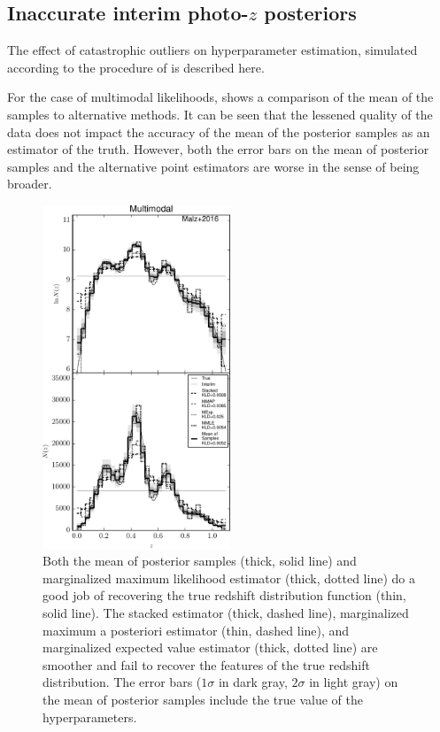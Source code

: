 \subsection{Inaccurate interim photo-$z$ posteriors}

The effect of catastrophic outliers on hyperparameter estimation, simulated according to the procedure of  is described here.  

For the case of multimodal likelihoods,  shows a comparison of the mean of the samples to alternative methods.  
It can be seen that the lessened quality of the data does not impact the accuracy of the mean of the posterior samples as an estimator of the truth.  
However, both the error bars on the mean of posterior samples and the alternative point estimators are worse in the sense of being broader.

\begin{figure}
	\includegraphics[width=0.5\textwidth]{figures/chippr/mult_comps.pdf}
	\caption{Both the mean of posterior samples (thick, solid line) and marginalized maximum likelihood estimator (thick, dotted line) do a good job of recovering the true redshift distribution function (thin, solid line).  
		The stacked estimator (thick, dashed line), marginalized maximum a posteriori estimator (thin, dashed line), and marginalized expected value estimator (thick, dotted line) are smoother and fail to recover the features of the true redshift distribution.  
		The error bars ($1\sigma$ in dark gray, $2\sigma$ in light gray) on the mean of posterior samples include the true value of the hyperparameters.}
\end{figure}

